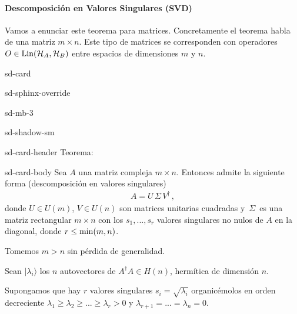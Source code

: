 \documentclass[letterpaper,10pt,english]{jupyterBook}
\newcommand{\ket}[1]{|#1\rangle}
\newcommand{\Hil}{{\cal H}}
\newcommand{\Lin}{\hbox{Lin}}
\begin{document}
\paragraph{Descomposición en Valores Singulares (SVD)}
\label{\detokenize{docs/Part_01_Formalismo/Chapter_01_02_Formalismo_matem_xe1tico/01_03_Operadores_myst:descomposicion-en-valores-singulares-svd}}
\sphinxAtStartPar
Vamos a enunciar este teorema para matrices. Concretamente el teorema habla de una matriz \(m\times n\). Este tipo de matrices se corresponden con operadores \(O \in \Lin(\Hil_A,\Hil_B)\) entre espacios de dimensiones \(m\) y \(n\).

\begin{sphinxuseclass}{sd-card}
\begin{sphinxuseclass}{sd-sphinx-override}
\begin{sphinxuseclass}{sd-mb-3}
\begin{sphinxuseclass}{sd-shadow-sm}
\begin{sphinxuseclass}{sd-card-header}
\sphinxAtStartPar
Teorema:

\end{sphinxuseclass}
\begin{sphinxuseclass}{sd-card-body}
\sphinxAtStartPar
Sea \(A\) una matriz compleja \(m\times n\). Entonces  admite la siguiente forma (descomposición en valores singulares)
\begin{equation*}
\begin{split}
A = U\,\Sigma\, V^{\dagger} \, ,
\end{split}
\end{equation*}
\sphinxAtStartPar
donde \(U\in U(m)\), \(V\in U(n)\) son matrices unitarias cuadradas y \(\,\Sigma \,\) es una matriz rectangular \(m\times n\) con los \(s_1, ...,s_r\) valores singulares  no nulos de \(A\)   en la diagonal, donde \(r\leq {\rm min}(m,n)\).

\end{sphinxuseclass}
\end{sphinxuseclass}
\end{sphinxuseclass}
\end{sphinxuseclass}
\end{sphinxuseclass}
\sphinxAtStartPar
{} Tomemos \(m>n\) sin pérdida de generalidad.

\sphinxAtStartPar
Sean \(\ket{\lambda_i}\) los \(n\) autovectores de \(A^\dagger A\in H(n)\), hermítica de dimensión \(n\).

\sphinxAtStartPar
Supongamos que hay \(r\)  valores singulares \(s_i = \sqrt{\lambda_i}\) organicémolos en orden decreciente
\(\lambda_1\geq \lambda_2\geq ... \geq \lambda_r > 0\) y \(\lambda_{r+1} = ... = \lambda_n = 0\).
\end{document}
